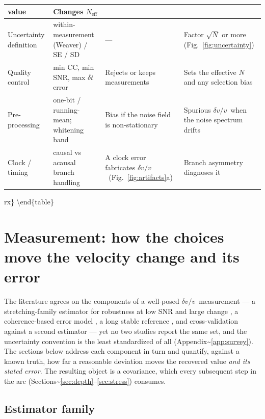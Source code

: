 \documentclass[
  11pt,
  letterpaper,
]{article}
\providecommand{\dvv}{\ensuremath{\delta v/v}}
\begin{document}
\begin{table}[htbp]
\begin{tabularx}{\textwidth}{@{}>{\raggedright\arraybackslash}p{2.35cm} L L L@{}}
value & Changes $N_{\mathrm{eff}}$ \\ \hline
Uncertainty definition & within-measurement (Weaver) / SE / SD &
--- & Factor $\sqrt{N}$ or more (Fig.~\ref{fig:uncertainty}) \\ \hline
Quality control & min CC, min SNR, max $\delta t$ error & Rejects or keeps
measurements & Sets the effective $N$ and any selection bias \\ \hline
Pre-processing & one-bit / running-mean; whitening band & Bias if the noise
field is non-stationary & Spurious \dvv\ when the noise spectrum drifts
\citep{Zhan2013} \\ \hline
Clock / timing & causal vs acausal branch handling & A clock error fabricates
\dvv\ (Fig.~\ref{fig:artifacts}a) & Branch asymmetry diagnoses it \\
\bottomrule
\end{tabularx}
\end{table}

rx\} \textbackslash end\{table\}

\section{Measurement: how the choices move the velocity change and its
error}\label{sec:results}

The literature agrees on the components of a well-posed \dvv~measurement
--- a stretching-family estimator for robustness at low SNR and large
change \citep{Mikesell2015, Yuan2021}, a coherence-based error model
\citep{Clarke2011, Weaver2011}, a long stable reference
\citep{Wang2017}, and cross-validation against a second estimator
\citep{Obermann2019} --- yet no two studies report the same set, and the
uncertainty convention is the least standardized of all
(Appendix\textasciitilde{}\ref{app:survey}). The sections below address
each component in turn and quantify, against a known truth, how far a
reasonable deviation moves the recovered value \emph{and its stated
error}. The resulting object is a covariance, which every subsequent
step in the arc
(Sections\textasciitilde{}\ref{sec:depth}--\ref{sec:stress}) consumes.

\subsection{Estimator family}\label{sec:methods-fig}
\end{document}
